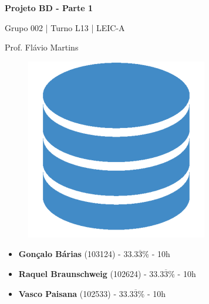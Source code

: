 \documentclass[12pt, a4paper]{article}
\begin{document}
  \begin{titlepage}
    \begin{center}
      \vspace*{5cm}
      \Huge
      \textbf{Projeto BD - Parte 1}

      \vspace{0.5cm}
      \LARGE
      Grupo 002 | Turno L13 | LEIC-A

      \vspace{0.5cm}
      \large
      Prof. Flávio Martins

      \vspace{0.5cm}
      \begin{figure}[h]
          \centering
          \includegraphics[scale=0.5]{report_logo.png}
      \end{figure}

      \vfill
      \large
      \begin{minipage}{0.8\textwidth}
        \begin{itemize}
          \item[] \textbf{Gonçalo Bárias} (103124) - 33.3$\overline{3}$\% - 10h
          \item[] \textbf{Raquel Braunschweig} (102624) - 33.3$\overline{3}$\% - 10h
          \item[] \textbf{Vasco Paisana} (102533) - 33.3$\overline{3}$\% - 10h
        \end{itemize}
      \end{minipage}
    \end{center}
  \end{titlepage}

  \begin{landscape}
    \centering
    
  \end{landscape}
\end{document}
